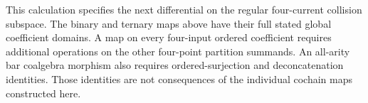This calculation specifies the next differential on the regular four-current collision subspace.
The binary and ternary maps above have their full stated global coefficient domains.
A map on every four-input ordered coefficient requires additional operations on the other four-point partition summands.
An all-arity bar coalgebra morphism also requires ordered-surjection and deconcatenation identities.
Those identities are not consequences of the individual cochain maps constructed here.
